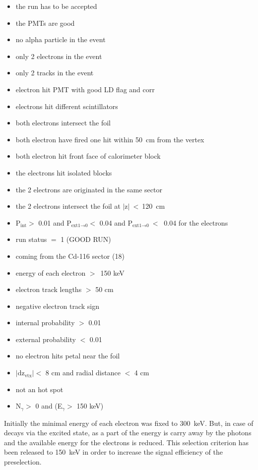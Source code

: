 \documentclass[main.tex]{subfiles}
\begin{document}
\begin{multicols}{2}
\begin{itemize}
\item the run has to be accepted
\item the PMTs are good 
\item no alpha particle in the event
\item only 2 electrons in the event 
\item only 2 tracks in the event 
\item electron hit PMT with good LD flag and corr
\item electrons hit different scintillators
\item both electrons intersect the foil
\item both electron have fired one hit within 50~cm from the vertex
\item both electron hit front face of calorimeter block
\item the electrons hit isolated blocks
\item the 2 electrons are originated in the same sector 
\item the 2 electrons intersect the foil at $|\text{z}|~<~$120~cm  
\item P$_{\text{int}} > $ 0.01 and P$_{\text{ext1} \rightarrow \text{0}} < $ 0.04 and P$_{\text{ext1} \rightarrow \text{0}}~<~$ 0.04 for the electrons 
\item run status $=$ 1 (GOOD RUN)  
\item coming from the Cd-116 sector (18)  
\item energy of each electron $>$~150 keV   
\item electron track lengths $> $ 50 cm   
\item negative electron track sign   
\item internal probability $>$ 0.01     
\item external probability $<$ 0.01   
\item no electron hits petal near the foil   
\item $|\text{dz}_\text{vtx}| < $ 8 cm and radial distance $ <$ 4 cm     
\item not an hot spot    
\item N$_{\gamma} >$ 0 and (E$_{\gamma}>$ 150 keV)  
 
\end{itemize}
\end{multicols}


\NI Initially the minimal energy of each electron was fixed to 300~keV. But, in case of decays via the excited state, as a part of the energy is carry away by the photons and the available energy for the electrons is reduced. This selection criterion has been released to 150~keV in order to increase the signal efficiency of the preselection.
\end{document}
